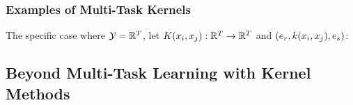 

\subsubsection*{Examples of Multi-Task Kernels}
The specific case where $\mathcal{Y} = \mathbb{R}^T$, let $K(x_i, x_j): \mathbb{R}^T \to \mathbb{R}^T$ and $\left( e_r, k(x_i, x_j), e_s \right)$:  

\subsection{Beyond Multi-Task Learning with Kernel Methods}











